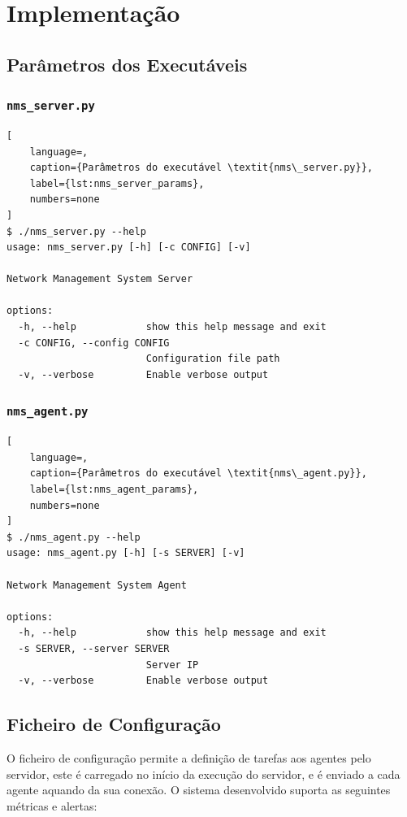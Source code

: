 \documentclass[a4paper,12pt]{scrreprt}
\begin{document}
\chapter{Implementação}

\section{Parâmetros dos Executáveis}

\subsection{\texttt{nms\_server.py}}

\begin{lstlisting}[
    language=,
    caption={Parâmetros do executável \textit{nms\_server.py}},
    label={lst:nms_server_params},
    numbers=none
]
$ ./nms_server.py --help
usage: nms_server.py [-h] [-c CONFIG] [-v]

Network Management System Server

options:
  -h, --help            show this help message and exit
  -c CONFIG, --config CONFIG
                        Configuration file path
  -v, --verbose         Enable verbose output
\end{lstlisting}

\subsection{\texttt{nms\_agent.py}}

\begin{lstlisting}[
    language=,
    caption={Parâmetros do executável \textit{nms\_agent.py}},
    label={lst:nms_agent_params},
    numbers=none
]
$ ./nms_agent.py --help
usage: nms_agent.py [-h] [-s SERVER] [-v]

Network Management System Agent

options:
  -h, --help            show this help message and exit
  -s SERVER, --server SERVER
                        Server IP
  -v, --verbose         Enable verbose output
\end{lstlisting}

\section{Ficheiro de Configuração}

O ficheiro de configuração permite a definição de tarefas aos agentes pelo servidor,
este é carregado no início da execução do servidor, e é enviado a cada agente aquando
da sua conexão. O sistema desenvolvido suporta as seguintes métricas e alertas:
\end{document}

